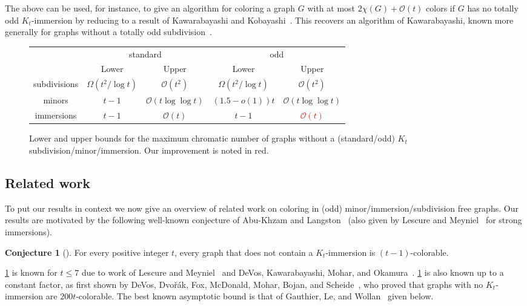 \documentclass{article}
\newcommand{\Cancel}[2][black]{{\color{#1}\cancel{\color{black}#2}}}
\theoremstyle{definition}
\newtheorem{conjecture}[environment]{Conjecture}
\begin{document}
The above can be used, for instance, to give an algorithm for coloring a graph $G$ with at most $2\chi(G) + \mathcal{O}(t)$ colors if $G$ has no totally odd $K_t$-immersion by reducing to a result of Kawarabayashi and Kobayashi~\cite{kawarabayashi2012list}. This recovers an algorithm of Kawarabayashi, known more generally for graphs without a totally odd subdivision~\cite{Kawarabayashi2013Totally}.

\begin{figure}
    \centering
    \begin{tabular}{c|c|c|c|c|}
         & \multicolumn{2}{|c|}{standard} & \multicolumn{2}{c|}{odd}\\
         & Lower & Upper & Lower & Upper \\
         \hline
         subdivisions & $\Omega(t^2/\log t)$ & $\mathcal{O}(t^2)$ & $\Omega(t^2/\log t)$ & $\mathcal{O}(t^2)$\\
        \hline
        minors & $t-1$ & $\mathcal{O}(t\log\log t)$ & $(1.5 - o(1))t$ & $\mathcal{O}(t\log\log t)$\\
        \hline
        immersions & $t-1$ & $\mathcal{O}(t)$ & $t-1$ & \Cancel[red]{$\mathcal{O}(t^2)$}\textcolor{red}{$\mathcal{O}(t)$}
    \end{tabular}
    \caption{Lower and upper bounds for the maximum chromatic number of graphs without a (standard/odd) $K_t$ subdivision/minor/immersion. Our improvement is noted in red.}
    \label{fig:asymptotics_summary}
\end{figure}

\subsection{Related work}

To put our results in context we now give an overview of related work on coloring in (odd) \linebreak
minor/immersion/subdivision free graphs. Our results are motivated by the following well-known conjecture of Abu-Khzam and Langston~\cite{Abu2003graph} (also given by Lescure and Meyniel~\cite{Lescure1988problem} for strong immersions).

\begin{conjecture}[{\cite{Abu2003graph}}]\label{conj:ImmersionHadwigers}
    For every positive integer $t$, every graph that does not contain a $K_t$-immersion is $(t-1)$-colorable.
\end{conjecture}

\cref{conj:ImmersionHadwigers} is known for $t \leq 7$ due to work of Lescure and Meyniel~\cite{Lescure1988problem} and DeVos, Kawarabayashi, Mohar, and Okamura~\cite{DeVos2010Immersing}. \cref{conj:ImmersionHadwigers} is also known up to a constant factor, as first shown by DeVos, Dvo{\v{r}}{\'a}k, Fox, McDonald, Mohar, Bojan, and Scheide~\cite{Devos2014Minimum}, who proved that graphs with no $K_t$-immersion are $200t$-colorable. The best known asymptotic bound is that of Gauthier, Le, and Wollan~\cite{Gauthier2019Forcing} given below.
\end{document}
